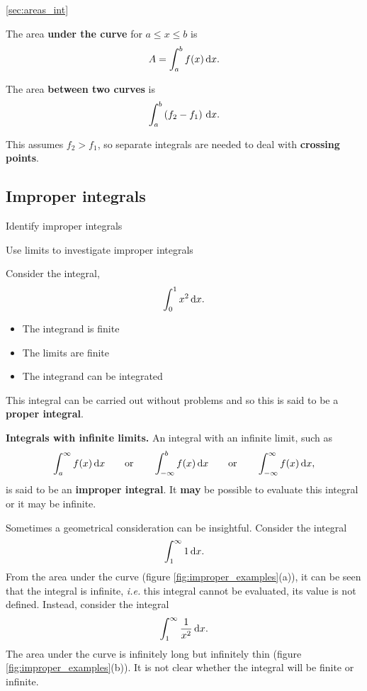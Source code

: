 \begin{recap}{\ref{sec:areas_int}}
\item The area \textbf{under the curve} for $a\leq x\leq b$ is
\[
A=\int_a^b f(x)\,{\rm d}x.
\]
\item The area \textbf{between two curves} is
\[
\int_a^b\left(f_2-f_1\right)\,{\rm d}x.
\]
\item This assumes $f_2>f_1$, so separate integrals are needed to deal with \textbf{crossing points}.
\end{recap}

\subsection{Improper integrals}
\label{sec:improper_int}

\begin{learningoutcomes}
\item Identify improper integrals
\item Use limits to investigate improper integrals
\end{learningoutcomes}

Consider the integral,
\[
\int_0^1 x^2\,{\rm d}x.
\]
\begin{itemize}
\item The integrand is finite
\item The limits are finite
\item The integrand can be integrated
\end{itemize}
This integral can be carried out without problems and so this is said to be a \textbf{proper integral}.

\textbf{Integrals with infinite limits.} An integral with an infinite limit, such as
\[
\int_a^\infty f(x)\,{\rm d}x
\qquad\text{or}\qquad
\int_{-\infty}^b f(x)\,{\rm d}x
\qquad\text{or}\qquad
\int_{-\infty}^\infty f(x)\,{\rm d}x,
\]
is said to be an \textbf{improper integral}. It \textbf{may} be possible to evaluate this integral or it may be infinite. 

Sometimes a geometrical consideration can be insightful. Consider the integral
\[
\int_1^\infty 1\, {\rm d}x.
\]
From the area under the curve (figure \ref{fig:improper_examples}(a)), it can be seen that the integral is infinite, \textit{i.e.} this integral cannot be evaluated, its value is not defined. Instead, consider the integral
\[
\int_1^\infty\frac{1}{x^2}\,{\rm d}x.
\]
The area under the curve is infinitely long but infinitely thin (figure \ref{fig:improper_examples}(b)). It is not clear whether the integral will be finite or infinite. 

